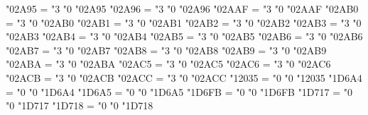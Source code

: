 \Umathcode "02A95 = "3 "0 "02A95
\Umathcode "02A96 = "3 "0 "02A96
\Umathcode "02AAF = "3 "0 "02AAF
\Umathcode "02AB0 = "3 "0 "02AB0
\Umathcode "02AB1 = "3 "0 "02AB1
\Umathcode "02AB2 = "3 "0 "02AB2
\Umathcode "02AB3 = "3 "0 "02AB3
\Umathcode "02AB4 = "3 "0 "02AB4
\Umathcode "02AB5 = "3 "0 "02AB5
\Umathcode "02AB6 = "3 "0 "02AB6
\Umathcode "02AB7 = "3 "0 "02AB7
\Umathcode "02AB8 = "3 "0 "02AB8
\Umathcode "02AB9 = "3 "0 "02AB9
\Umathcode "02ABA = "3 "0 "02ABA
\Umathcode "02AC5 = "3 "0 "02AC5
\Umathcode "02AC6 = "3 "0 "02AC6
\Umathcode "02ACB = "3 "0 "02ACB
\Umathcode "02ACC = "3 "0 "02ACC
\Umathcode "12035 = "0 "0 "12035
\Umathcode "1D6A4 = "0 "0 "1D6A4
\Umathcode "1D6A5 = "0 "0 "1D6A5
\Umathcode "1D6FB = "0 "0 "1D6FB
\Umathcode "1D717 = "0 "0 "1D717
\Umathcode "1D718 = "0 "0 "1D718




\the\everymathit


